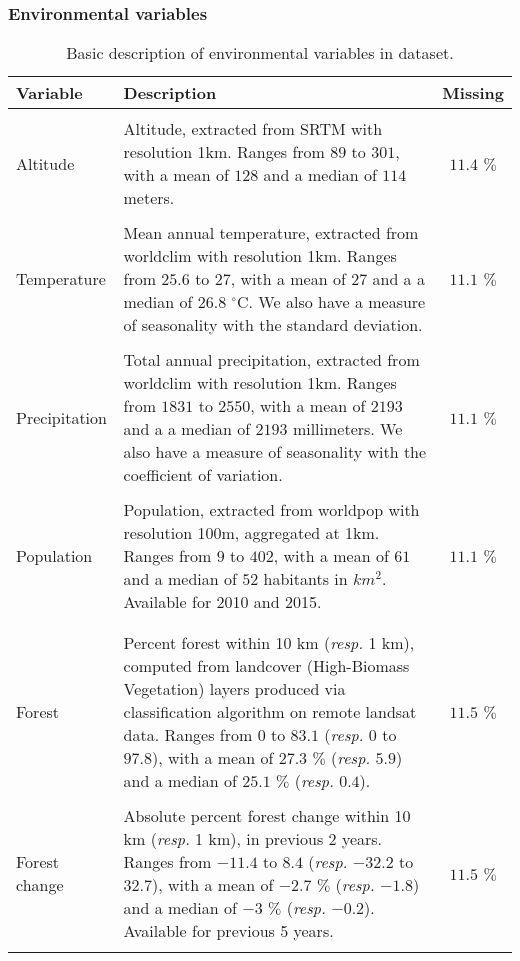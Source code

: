 \documentclass{article}\usepackage[]{graphicx}\usepackage[]{color}
\begin{document}
\newpage

\subsubsection{Environmental variables}


\begin{table}[htp]
\begin{center}
\begin{tabular}{lp{10.5cm}c}
Variable & Description & Missing \\ \hline
&& \\
Altitude & Altitude, extracted from SRTM with resolution 1km. Ranges from  \(89\) to \(301\), with a mean of \(128\) and a median of \(114\) meters. & \(11.4\) $\%$ \\
&& \\
Temperature & Mean annual temperature, extracted from worldclim with resolution 1km. Ranges from  \(25.6\) to \(27\), with a mean of \(27\) and a a median of \(26.8\) $^\circ$C. We also have a measure of seasonality with the standard deviation. & \(11.1\) $\%$ \\
&& \\
Precipitation & Total annual precipitation, extracted from worldclim with resolution 1km. Ranges from  \(1831\) to \(2550\), with a mean of \(2193\) and a a median of \(2193\) millimeters. We also have a measure of seasonality with the coefficient of variation. & \(11.1\) $\%$ \\
&& \\
Population & Population, extracted from worldpop with resolution 100m, aggregated at 1km. Ranges from  \(9\) to \(402\), with a mean of \(61\) and a median of \(52\) habitants in $km^{2}$. Available for 2010 and 2015. & \(11.1\) $\%$ \\
&& \\ \hline
&& \\
Forest & Percent forest within 10 km (\textit{resp.} 1 km), computed from landcover (High-Biomass Vegetation) layers produced via classification algorithm on remote landsat data. Ranges from  \(0\) to \(83.1\) (\textit{resp.} \(0\) to \(97.8\)), with a mean of \(27.3\) $\%$ (\textit{resp.} \(5.9\)) and a median of \(25.1\) $\%$ (\textit{resp.} \(0.4\)). & \(11.5\) $\%$ \\
&& \\
Forest change & Absolute percent forest change within 10 km (\textit{resp.} 1 km), in previous 2 years. Ranges from  \(-11.4\) to \(8.4\) (\textit{resp.}  \(-32.2\) to \(32.7\)), with a mean of \(-2.7\) $\%$ (\textit{resp.} \(-1.8\)) and a median of \(-3\) $\%$ (\textit{resp.} \(-0.2\)). Available for previous 5 years. & \(11.5\) $\%$ \\
&& \\ \hline

\end{tabular}
\caption{Basic description of environmental variables in dataset.}
\label{table:Table_Basic_Description_Environmental}
\end{center}
\end{table}
\end{document}
